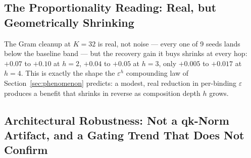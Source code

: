\subsection{The Proportionality Reading: Real, but Geometrically
Shrinking}

The Gram cleanup at $K{=}32$ is real, not noise --- every one of 9 seeds
lands below the baseline band --- but the recovery gain it buys shrinks
at every hop: $+0.07$ to $+0.10$ at $h{=}2$, $+0.04$ to $+0.05$ at
$h{=}3$, only $+0.005$ to $+0.017$ at $h{=}4$. This is exactly the shape
the $\varepsilon^h$ compounding law of Section~\ref{sec:phenomenon}
predicts: a modest, real reduction in per-binding $\varepsilon$ produces
a benefit that shrinks in reverse as composition depth $h$ grows.

\subsection{Architectural Robustness: Not a qk-Norm Artifact, and a
Gating Trend That Does Not Confirm}

